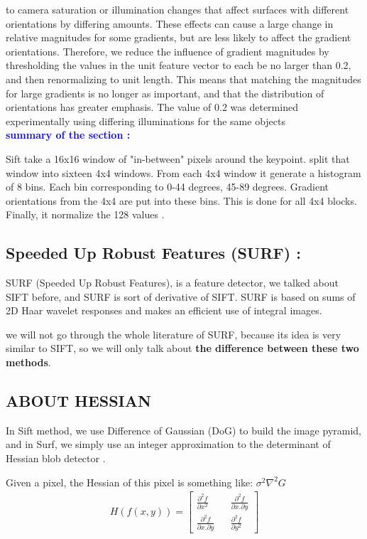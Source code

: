 to camera saturation or illumination changes that affect surfaces with different orientations
by differing amounts. These effects can cause a large change in relative magnitudes for
some gradients, but are less likely to affect the gradient orientations. Therefore, we reduce
the influence of gradient magnitudes by thresholding the values in the unit feature vector to
each be no larger than 0.2, and then renormalizing to unit length. This means that matching
the magnitudes for large gradients is no longer as important, and that the distribution of
orientations has greater emphasis. The value of 0.2 was determined experimentally using
differing illuminations for the same objects\\

\textcolor{blue}{\textbf{summary of the section :}}

Sift take  a 16x16 window of "in-between" pixels around the keypoint. split that window into sixteen 4x4 windows. From each 4x4 window it generate a histogram of 8 bins. Each bin corresponding to 0-44 degrees, 45-89 degrees. Gradient orientations from the 4x4 are put into these bins. This is done for all 4x4 blocks. Finally, it normalize the 128 values .

\subsection{Speeded Up Robust Features (SURF) :} \label{surf}
SURF (Speeded Up Robust Features), is a feature detector, we talked about SIFT before, and SURF is sort of derivative of SIFT. SURF is based on sums of 2D Haar wavelet responses and makes an efficient use of integral images.

we will not go through  the whole literature  of SURF, because its idea is very similar to SIFT, so we will only talk about \textbf{the difference between these two methods}.

\subsection{ABOUT HESSIAN}
In Sift method, we use Difference of Gaussian (DoG) to build the image pyramid, and in Surf, we simply use an integer approximation to the determinant of Hessian blob detector .

Given a pixel, the Hessian of this pixel is something like:
$\sigma^2\nabla^2G$ \\

\begin{gather}
H(f(x,y)) =
\begin{bmatrix}
                 {\frac {\partial^2 f} {\partial x^2}} && { \frac {\partial^2 f} {\partial x.\partial y} }\\
                 {\frac  {\partial^2 f}{\partial x.\partial y}} && { \frac {\partial^2 f} {\partial y^2}}
\end{bmatrix}
\end{gather}

